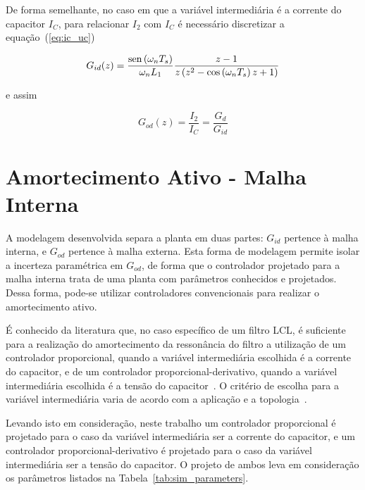     De forma semelhante, no caso em que a variável intermediária é a corrente do
    capacitor $I_C$, para relacionar $I_2$ com $I_C$ é necessário discretizar a
    equação~(\ref{eq:ic_uc})

    \begin{equation}
        G_{id}(z) = \frac{\operatorname{sen} \left( \omega_n T_s \right)}{\omega_n L_1}
            \frac{z-1}{z \left( z^2 - \cos \left( \omega_n T_s \right) z + 1 \right)}
    \end{equation}

    e assim

    \begin{equation}
        G_{od}(z) = \frac{I_2}{I_C} = \frac{G_d}{G_{id}}
    \end{equation}



\section{Amortecimento Ativo - Malha Interna}

    A modelagem desenvolvida separa a planta em duas partes: $G_{id}$ pertence à malha
    interna, e $G_{od}$ pertence à malha externa. Esta forma de modelagem permite isolar
    a incerteza paramétrica em $G_{od}$, de forma que o controlador projetado para a
    malha interna trata de uma planta com parâmetros conhecidos e projetados. Dessa forma,
    pode-se utilizar controladores convencionais para realizar o amortecimento ativo.

    É conhecido da literatura que, no caso específico de um filtro LCL, é suficiente
    para a realização do amortecimento da ressonância do filtro a utilização de um
    controlador proporcional, quando a variável intermediária escolhida é a corrente do
    capacitor, e de um controlador proporcional-derivativo, quando a variável intermediária
    escolhida é a tensão do capacitor~\cite{ref:DANNEHL}. O critério de escolha para a
    variável intermediária varia de acordo com a aplicação e a topologia~\cite{ref:POH}.

    Levando isto em consideração, neste trabalho um controlador proporcional é projetado
    para o caso da variável intermediária ser a corrente do capacitor, e um controlador
    proporcional-derivativo é projetado para o caso da variável intermediária ser a
    tensão do capacitor. O projeto de ambos leva em consideração os parâmetros listados
    na Tabela~\ref{tab:sim_parameters}.

